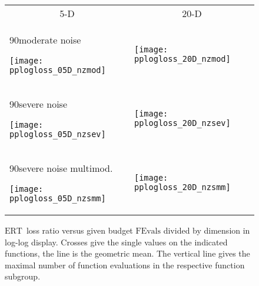 \documentclass{article}
\newcommand{\ERT}{\ensuremath{\mathrm{ERT}}}
\newcommand{\FEvals}{\ensuremath{\mathrm{FEvals}}}
\newcommand{\rot}[2][2.5]{
  \hspace*{-3.5\baselineskip}%
  \begin{rotate}{90}\hspace{#1em}#2
  \end{rotate}}
\begin{document}
\begin{figure}[htbp!]
\centering
\begin{tabular}{@{}ll@{}}
\multicolumn{1}{c}{5-D} & \multicolumn{1}{c}{20-D}\\
\rot[4.3]{moderate noise}
\texttt{[image: pplogloss\_05D\_nzmod]} &
\texttt{[image: pplogloss\_20D\_nzmod]}\\[-2ex]
\rot[4.8]{severe noise}
\texttt{[image: pplogloss\_05D\_nzsev]} &
\texttt{[image: pplogloss\_20D\_nzsev]}\\[-2ex]
\rot[2.6]{severe noise multimod.}
\texttt{[image: pplogloss\_05D\_nzsmm]} &
\texttt{[image: pplogloss\_20D\_nzsmm]}
\end{tabular}
\caption{\label{fig:ERTloglossb\algfolder}\ERT\ loss ratio versus given budget
$\FEvals$ divided by dimension in log-log display. Crosses give
the single values on the indicated functions, the line is the geometric mean.
The vertical line gives the maximal number of function evaluations in the
respective function subgroup.}
\end{figure}
\end{document}
